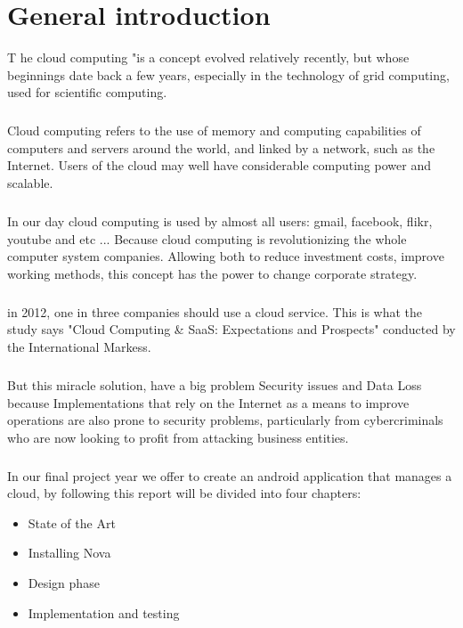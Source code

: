 \chapter{General introduction}
\lettrine[lines=3]{T}{} he cloud computing "is a concept evolved relatively recently, but whose beginnings date back a few years, 
especially in the technology of grid computing, used for scientific computing.
\paragraph{}Cloud computing refers to the use of memory and computing capabilities of computers and servers around the world, 
and linked by a network, such as the Internet. 
Users of the cloud may well have considerable computing power and scalable.\par
\paragraph{}In our day cloud computing is used by almost all users: gmail, facebook, flikr, youtube and etc ... Because cloud computing is revolutionizing 
the whole computer system companies. Allowing both to reduce investment costs, 
improve working methods, this concept has the power to change corporate strategy.\par
\paragraph{}in 2012, one in three companies should use a cloud service. 
This is what the study says "Cloud Computing \& SaaS: Expectations and Prospects" conducted by the International Markess.\par
\paragraph{}But this miracle solution, have a big problem Security issues and Data Loss because Implementations that rely on the Internet 
as a means to improve operations are also prone to security problems, 
particularly from cybercriminals who are now looking to profit from attacking business entities.\par

\paragraph{}In our final project year we offer to create an android application that manages a cloud,
 by following this report will be divided into four chapters:
\begin{itemize}
 \item State of the Art
 \item Installing Nova
 \item Design phase
 \item Implementation and testing
\end{itemize}



